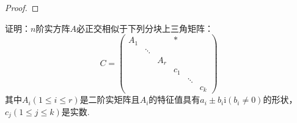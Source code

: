 \documentclass[../../main.tex]{subfiles}
\begin{document}
\begin{proof}
\end{proof}

\begin{proposition}\label{proposition:两个半正定阵可同时合同对角化7}
证明：\(n\)阶实方阵\(A\)必正交相似于下列分块上三角矩阵：
\[
C = 
\begin{pmatrix}
A_1 & & & * \\
& \ddots & & \\
& & A_r & \\
& & & c_1 & \\
& & & & \ddots & \\
& & & & & c_k
\end{pmatrix}
\]
其中\(A_i(1\leqslant  i\leqslant  r)\)是二阶实矩阵且\(A_i\)的特征值具有\(a_i\pm b_i\mathrm{i}(b_i\neq0)\)的形状，\(c_j(1\leqslant  j\leqslant  k)\)是实数.
\end{proposition}
\end{document}
